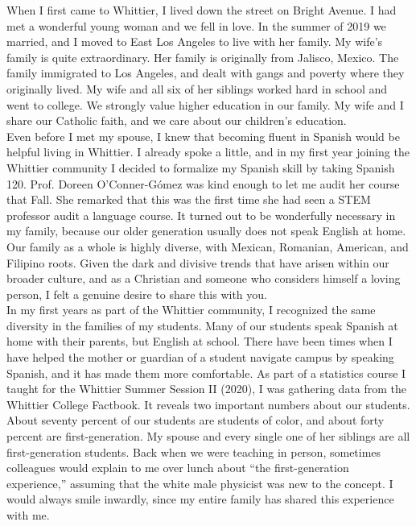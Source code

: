 \documentclass[../../main.tex]{subfiles}
\begin{document}
When I first came to Whittier, I lived down the street on Bright Avenue.  I had met a wonderful young woman and we fell in love.  In the summer of 2019 we married, and I moved to East Los Angeles to live with her family.  My wife's family is quite extraordinary.  Her family is originally from Jalisco, Mexico.  The family immigrated to Los Angeles, and dealt with gangs and poverty where they originally lived.  My wife and all six of her siblings worked hard in school and went to college.  We strongly value higher education in our family.  My wife and I share our Catholic faith, and we care about our children's education.
\\
\vspace{0.25cm}
Even before I met my spouse, I knew that becoming fluent in Spanish would be helpful living in Whittier.  I already spoke a little, and in my first year joining the Whittier community I decided to formalize my Spanish skill by taking Spanish 120. Prof. Doreen O'Conner-G\'{o}mez was kind enough to let me audit her course that Fall.  She remarked that this was the first time she had seen a STEM professor audit a language course.  It turned out to be wonderfully necessary in my family, because our older generation usually does not speak English at home.  Our family as a whole is highly diverse, with Mexican, Romanian, American, and Filipino roots.  Given the dark and divisive trends that have arisen within our broader culture, and as a Christian and someone who considers himself a loving person, I felt a genuine desire to share this with you.
\\
\vspace{0.25cm}
In my first years as part of the Whittier community, I recognized the same diversity in the families of my students.  Many of our students speak Spanish at home with their parents, but English at school.  There have been times when I have helped the mother or guardian of a student navigate campus by speaking Spanish, and it has made them more comfortable.  As part of a statistics course I taught for the Whittier Summer Session II (2020), I was gathering data from the Whittier College Factbook.  It reveals two important numbers about our students.  About seventy percent of our students are students of color, and about forty percent are first-generation.  My spouse and every single one of her siblings are all first-generation students.  Back when we were teaching in person, sometimes colleagues would explain to me over lunch about ``the first-generation experience,'' assuming that the white male physicist was new to the concept.  I would always smile inwardly, since my entire family has shared this experience with me.
\end{document}
